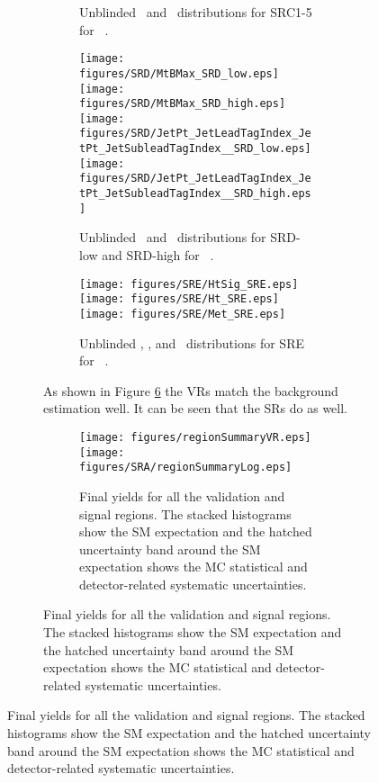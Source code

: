 \begin{figure}[htbp]
\begin{center}
\begin{figure}[htbp]
\begin{center}
{{{\begin{figure}[!hp] 
\begin{center}
\caption{Unblinded \rISR\ and \pTISR\ distributions for SRC1-5 for \intlumi\ \ifb.}
\label{fig:SRCunblinded}
\end{center}
\end{figure}


\begin{figure}[!hxp] 
\begin{center}
\texttt{[image: figures/SRD/MtBMax\_SRD\_low.eps]}
\texttt{[image: figures/SRD/MtBMax\_SRD\_high.eps]}
\texttt{[image: figures/SRD/JetPt\_JetLeadTagIndex\_JetPt\_JetSubleadTagIndex\_\_SRD\_low.eps]}
\texttt{[image: figures/SRD/JetPt\_JetLeadTagIndex\_JetPt\_JetSubleadTagIndex\_\_SRD\_high.eps]}

\caption{Unblinded \mtbmax\ and \ptone\ distributions for SRD-low and SRD-high for \intlumi\ \ifb.}
\label{fig:SRDunblinded}
\end{center}
\end{figure}


\begin{figure}[!hp] 
\begin{center}
\texttt{[image: figures/SRE/HtSig\_SRE.eps]}
\texttt{[image: figures/SRE/Ht\_SRE.eps]}
\texttt{[image: figures/SRE/Met\_SRE.eps]}
\caption{Unblinded \htsig, \HT, and \met\ distributions for SRE for \intlumi\ \ifb.}
\label{fig:SREunblinded}
\end{center}
\end{figure}



As shown in Figure \ref{fig:srSum} the VRs match the background estimation well.  It can be seen that the SRs do as well.  \\


\begin{figure}[!hp] 
\begin{center}
 \texttt{[image: figures/regionSummaryVR.eps]}\\ %
 \texttt{[image: figures/SRA/regionSummaryLog.eps]}%
    \caption{Final yields for all the validation and signal regions. The stacked histograms show the SM expectation and the hatched uncertainty band around the SM expectation shows the MC statistical and detector-related systematic uncertainties.}
    \label{fig:srSum}
\end{center}
\end{figure}



}}}
\end{center}
\end{figure}
\end{center}
\end{figure}
